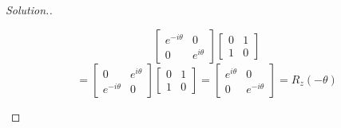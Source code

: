 \documentclass[12pt]{article}
\begin{document}
\begin{proof}[Solution.]
\begin{enumerate}[label=(\alph*)]
$$\begin{bmatrix}
e^{-i\theta} & 0\\
0 & e^{i\theta}
\end{bmatrix}\begin{bmatrix}
0 & 1\\
1 & 0
\end{bmatrix}$$
$$=\begin{bmatrix}
0 & e^{i\theta}\\
e^{-i\theta} & 0
\end{bmatrix}\begin{bmatrix}
0 & 1\\
1 & 0
\end{bmatrix}=\begin{bmatrix}
e^{i\theta} & 0\\
0 & e^{-i\theta}
\end{bmatrix}=R_z(-\theta)$$


\end{enumerate}
\end{proof}
\end{document}
